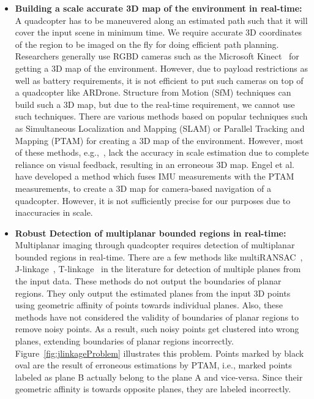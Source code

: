\begin{itemize}
  \item \textbf{Building a scale accurate 3D map of the environment in
  real-time:} A quadcopter has to be maneuvered along an estimated path such
  that it will cover the input scene in minimum time. We require accurate
  3D coordinates of the region to be imaged on the fly for doing efficient path
  planning. Researchers generally use RGBD cameras such as the Microsoft
  Kinect~\cite{Zhang:2012} for getting a 3D map of the environment. However,
  due to payload restrictions as well as battery requirements, it is not
  efficient to put such cameras on top of a quadcopter like ARDrone. Structure
  from Motion (SfM) techniques can build such a 3D map, but due to the
  real-time requirement, we cannot use such techniques. There are various
  methods based on popular techniques such as Simultaneous Localization and
  Mapping (SLAM) or Parallel Tracking and Mapping (PTAM) for creating a 3D map
  of the environment. However, most of these methods, e.g.,~\cite{klein}, lack
  the accuracy in scale estimation due to complete reliance on visual feedback,
  resulting in an erroneous 3D map. Engel et al.~\cite{engel} have developed a
  method which fuses IMU measurements with the PTAM measurements, to create a
  3D map for camera-based navigation of a quadcopter. However, it is not
  sufficiently precise for our purposes due to inaccuracies in scale.
  
  \item \textbf{Robust Detection of multiplanar bounded regions in real-time:} 
  Multiplanar imaging through quadcopter requires detection of multiplanar
  bounded regions in real-time. There are a few methods like
  multiRANSAC~\cite{zuliani}, J-linkage~\cite{jlinkage},
  T-linkage~\cite{tlinkage} in the literature for detection of multiple planes
  from the input data. These methods do not output the boundaries of planar
  regions. They only output the estimated planes from the input 3D points using
  geometric affinity of points towards individual planes. Also, these methods
  have not considered the validity of boundaries of planar regions to remove
  noisy points. As a result, such noisy points get clustered into wrong planes,
  extending boundaries of planar regions incorrectly.
  Figure~\ref{fig:jlinkageProblem} illustrates this problem. Points marked by
  black oval are the result of erroneous estimations by PTAM, i.e., marked
  points labeled as plane B actually belong to the plane A and vice-versa. 
  Since their geometric affinity is towards opposite planes, they are labeled
  incorrectly.


\end{itemize}
